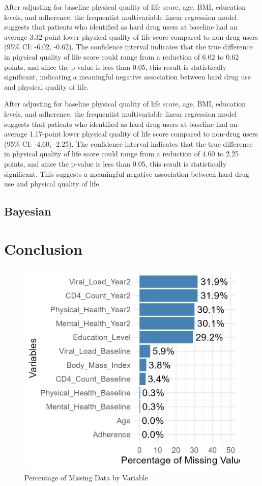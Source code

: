\documentclass[
  12pt,
]{article}
\begin{document}
After adjusting for baseline physical quality of life score, age, BMI,
education levels, and adherence, the frequentist multivariable linear
regression model suggests that patients who identified as hard drug
users at baseline had an average 3.32-point lower physical quality of
life score compared to non-drug users (95\% CI: -6.02, -0.62). The
confidence interval indicates that the true difference in physical
quality of life score could range from a reduction of 6.02 to 0.62
points, and since the p-value is less than 0.05, this result is
statistically significant, indicating a meaningful negative association
between hard drug use and physical quality of life.

After adjusting for baseline physical quality of life score, age, BMI,
education levels, and adherence, the frequentist multivariable linear
regression model suggests that patients who identified as hard drug
users at baseline had an average 1.17-point lower physical quality of
life score compared to non-drug users (95\% CI: -4.60, -2.25). The
confidence interval indicates that the true difference in physical
quality of life score could range from a reduction of 4.60 to 2.25
points, and since the p-value is less than 0.05, this result is
statistically significant. This suggests a meaningful negative
association between hard drug use and physical quality of life.

\hypertarget{bayesian}{%
\subsection{Bayesian}\label{bayesian}}

\hypertarget{conclusion}{%
\section{Conclusion}\label{conclusion}}

\begin{figure}
\includegraphics[width=14.08in]{../DataProcessed/missing visulization} \caption{Percentage of Missing Data by Variable}\label{fig:unnamed-chunk-2}
\end{figure}
\end{document}
